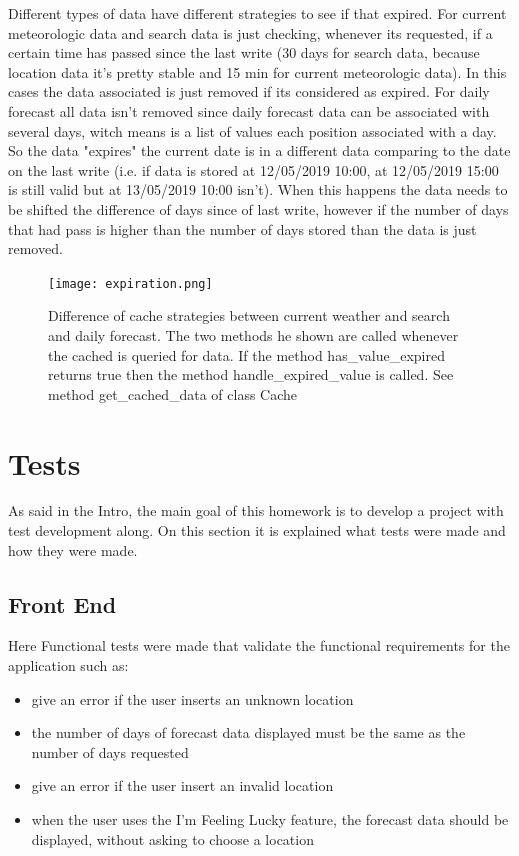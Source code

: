 \documentclass[12pt]{article}
\begin{document}
Different types of data have different strategies to see if that expired. For current meteorologic data
  and search data is just checking, whenever its requested, if a certain time has passed since the
  last write (30 days for search data, because location data it's pretty stable and 15 min for
  current meteorologic data). In this cases the data associated is just removed if its considered as
  expired. For daily forecast all data isn't removed since daily forecast data can be associated
  with several days, witch means is a list of values each position associated with a day. So the data
  "expires" the current date is in a different data comparing to the date on the last write (i.e. if
  data is stored at 12/05/2019 10:00, at 12/05/2019 15:00 is still valid but at 13/05/2019 10:00 isn't).
  When this happens the data needs to be shifted the difference of days since of last write, however if
  the number of days that had pass is higher than the number of days stored than the data is just removed.

\begin{figure}[h]
  \center
  \texttt{[image: expiration.png]}
  \caption{Difference of cache strategies between current weather and search and daily forecast.
    The two methods he shown are called whenever the cached is queried for data. If the
    method has\_value\_expired returns true then the method handle\_expired\_value is called. See
    method get\_cached\_data of class Cache}
\end{figure}

\section{Tests}

As said in the Intro, the main goal of this homework is to develop a project with
  test development along. On this section it is explained what tests were made
  and how they were made.

\subsection{Front End}

Here Functional tests were made that validate the functional requirements for the application such as:
\begin{itemize}
  \item give an error if the user inserts an unknown location
  \item the number of days of forecast data displayed must be the same as the number
    of days requested
  \item give an error if the user insert an invalid location
  \item when the user uses the I'm Feeling Lucky feature, the forecast data should be
    displayed, without asking to choose a location
\end{itemize}
\end{document}

